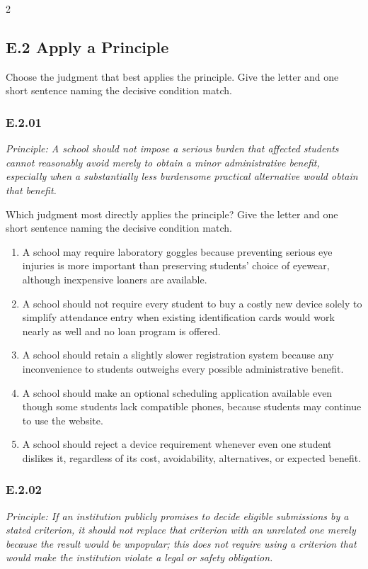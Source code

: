 \documentclass[10pt]{extarticle}
\newcommand{\choice}[1]{\item #1}
\newcommand{\bankitem}[1]{\subsubsection*{#1}}
\begin{document}
\begin{multicols}{2}
\subsection*{E.2 Apply a Principle}
Choose the judgment that best applies the principle. Give the letter and one
short sentence naming the decisive condition match.
\bankitem{E.2.01}
\emph{Principle: A school should not impose a serious burden that affected students cannot reasonably avoid merely to obtain a minor administrative benefit, especially when a substantially less burdensome practical alternative would obtain that benefit.}

Which judgment most directly applies the principle? Give the letter and one short sentence naming the decisive condition match.
\begin{enumerate}[label=(\alph*)]
  \choice{A school may require laboratory goggles because preventing serious eye injuries is more important than preserving students' choice of eyewear, although inexpensive loaners are available.}
  \choice{A school should not require every student to buy a costly new device solely to simplify attendance entry when existing identification cards would work nearly as well and no loan program is offered.}
  \choice{A school should retain a slightly slower registration system because any inconvenience to students outweighs every possible administrative benefit.}
  \choice{A school should make an optional scheduling application available even though some students lack compatible phones, because students may continue to use the website.}
  \choice{A school should reject a device requirement whenever even one student dislikes it, regardless of its cost, avoidability, alternatives, or expected benefit.}
\end{enumerate}
\bankitem{E.2.02}
\emph{Principle: If an institution publicly promises to decide eligible submissions by a stated criterion, it should not replace that criterion with an unrelated one merely because the result would be unpopular; this does not require using a criterion that would make the institution violate a legal or safety obligation.}


\end{multicols}
\end{document}

